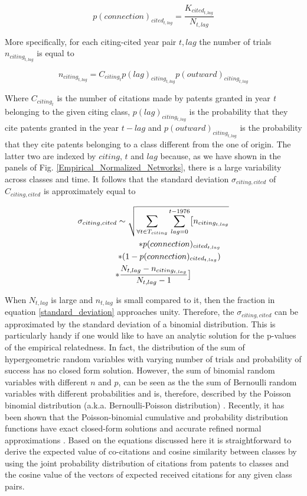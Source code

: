 \documentclass[pre,reprint,groupedaddress,superscriptaddress]{revtex4-1}
\begin{document}
\begin{equation}
p(connection)_{cited_{t,lag}} = \frac{K_{cited_{t,lag}}}{N_{t,lag}}
\end{equation}\label{probability_connection}

More specifically, for each citing-cited year pair ${t,lag}$ the number of trials $n_{citing_{t,lag}}$ is equal to

\begin{equation}
n_{citing_{t,lag}} = C_{citing_{t}} p(lag)_{citing_{t,lag}} p(outward)_{citing_{t,lag}}
\end{equation}\label{number_of_trials}

Where $C_{citing_{t}}$ is the number of citations made by patents granted in year \textit{t} belonging to the given citing class, $p(lag)_{citing_{t,lag}}$ is the probability that they cite patents granted in the year ${t-lag}$ and $p(outward)_{citing_{t,lag}}$ is the probability that they cite patents belonging to a class different from the one of origin. The latter two are indexed by $citing$, $t$ and $lag$ because, as we have shown in the panels of Fig. \ref{Empirical_Normalized_Networks}, there is a large variability across classes and time. It follows that the standard deviation $\sigma_{citing,cited}$ of ${C_{citing,cited}}$ is approximately equal to

\begin{multline}\label{standard_deviation}
\sigma_{citing,cited} \sim 
\sqrt{ 
\sum_{\forall t \in T_{citing}}\sum_{lag=0}^{t-1976} \bigl[ n_{citing_{t,lag}}} \\
\shoveright{* p(connection)_{cited_{t,lag}}} \\
\shoveright{* (1-p(connection)_{cited_{t,lag}})} \\
* \frac{N_{t,lag}-n_{citing_{t,lag}}}{N_{t,lag}-1} \bigr]  
\end{multline}

When $N_{t,lag}$ is large and $n_{t,lag}$ is small compared to it, then the fraction in equation \ref{standard_deviation} approaches unity. Therefore, the $\sigma_{citing,cited}$ can be approximated by the standard deviation of a binomial distribution. This is particularly handy if one would like to have an analytic solution for the p-values of the empirical relatedness. In fact, the distribution of the sum of hypergeometric random variables with varying number of trials and probability of success has no closed form solution. However, the sum of binomial random variables with different $n$ and $p$, can be seen as the the sum of Bernoulli random variables with different probabilities and is, therefore, described by the Poisson binomial distribution (a.k.a. Bernoulli-Poisson distribution) \cite{Hong2013, Fernandez2010, Chen1997}. Recently, it has been shown that the Poisson-binomial cumulative and probability distribution functions have exact closed-form solutions and accurate refined normal approximations \cite{Hong2013}. Based on the equations discussed here it is straightforward to derive the expected value of co-citations and cosine similarity between classes by using the joint probability distribution of citations from patents to classes and the cosine value of the vectors of expected received citations for any given class pairs.
 
\end{document}
